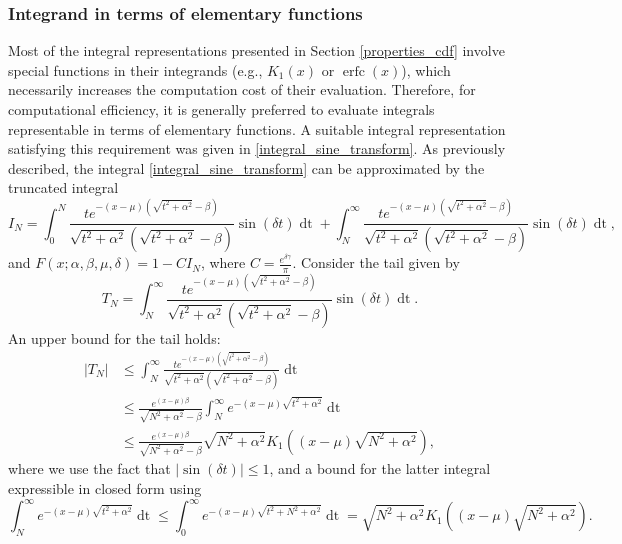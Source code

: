 \documentclass[10pt,a4paper,oneside]{article}
\DeclareMathOperator{\erfc}{erfc}
\numberwithin{equation}{section}
\begin{document}
\subsubsection{Integrand in terms of elementary functions}
Most of the integral representations presented in Section \ref{properties_cdf} involve special functions in their integrands (e.g., $K_1(x)$ or $\erfc(x)$), which necessarily increases the computation cost of their evaluation. Therefore, for computational efficiency, it is generally preferred to evaluate integrals representable in terms of elementary functions. A suitable integral representation satisfying this requirement was given in \eqref{integral_sine_transform}. As previously described, the integral \eqref{integral_sine_transform} can be approximated by the truncated integral 
\begin{equation}\label{truncated_integral_sine_transform}
I_N = \int_0^N \frac{t e^{-(x-\mu)\left(\sqrt{t^2 + \alpha^2} - \beta\right)}}{\sqrt{t^2 + \alpha^2}\left(\sqrt{t^2 + \alpha^2} - \beta\right)}\sin(\delta t)\mathop{dt} + \int_N^{\infty} \frac{t e^{-(x-\mu)\left(\sqrt{t^2 + \alpha^2} - \beta\right)}}{\sqrt{t^2 + \alpha^2}\left(\sqrt{t^2 + \alpha^2} - \beta\right)}\sin(\delta t)\mathop{dt},
\end{equation}
and $F(x; \alpha, \beta, \mu, \delta) = 1 - C I_N$, where $C = \frac{e^{\delta \gamma}}{\pi}$. Consider the tail given by
\begin{equation}
T_N = \int_N^{\infty} \frac{t e^{-(x-\mu)\left(\sqrt{t^2 + \alpha^2} - \beta\right)}}{\sqrt{t^2 + \alpha^2}\left(\sqrt{t^2 + \alpha^2} - \beta\right)}\sin(\delta t)\mathop{dt}.
\end{equation}
An upper bound for the tail holds:
\begin{align*}
|T_N| &\le \int_N^{\infty} \frac{t e^{-(x-\mu)\left(\sqrt{t^2 + \alpha^2} - \beta\right)}}{\sqrt{t^2 + \alpha^2}\left(\sqrt{t^2 + \alpha^2} - \beta\right)}\mathop{dt}\\
&\le \frac{e^{(x-\mu)\beta}}{\sqrt{N^2 + \alpha^2} - \beta}\int_N^{\infty} e^{-(x-\mu)\sqrt{t^2 + \alpha^2}} \mathop{dt}\\
&\le \frac{e^{(x-\mu)\beta}}{\sqrt{N^2 + \alpha^2} - \beta} \sqrt{N^2 + \alpha^2} K_1((x-\mu)\sqrt{N^2 + \alpha^2}),
\end{align*}
where we use the fact that $|\sin(\delta t)| \le 1$, and a bound for the latter integral expressible in closed form using \cite[\S 3.461]{gradshteyn2007}
\begin{equation*}
\int_N^{\infty} e^{-(x-\mu)\sqrt{t^2 + \alpha^2}} \mathop{dt} \le \int_0^{\infty} e^{-(x-\mu)\sqrt{t^2 + N^2 + \alpha^2}} \mathop{dt} = \sqrt{N^2 + \alpha^2} K_1((x-\mu)\sqrt{N^2 + \alpha^2}).
\end{equation*}
\end{document}
